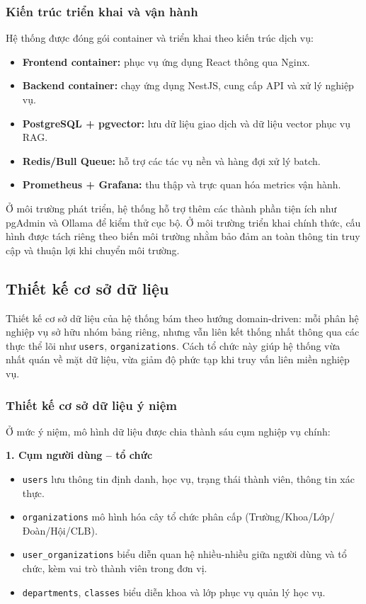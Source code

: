 \subsubsection{Kiến trúc triển khai và vận hành}
Hệ thống được đóng gói container và triển khai theo kiến trúc dịch vụ:
\begin{itemize}
	\item \textbf{Frontend container:} phục vụ ứng dụng React thông qua Nginx.
	\item \textbf{Backend container:} chạy ứng dụng NestJS, cung cấp API và xử lý nghiệp vụ.
	\item \textbf{PostgreSQL + pgvector:} lưu dữ liệu giao dịch và dữ liệu vector phục vụ RAG.
	\item \textbf{Redis/Bull Queue:} hỗ trợ các tác vụ nền và hàng đợi xử lý batch.
	\item \textbf{Prometheus + Grafana:} thu thập và trực quan hóa metrics vận hành.
\end{itemize}

Ở môi trường phát triển, hệ thống hỗ trợ thêm các thành phần tiện ích như pgAdmin và Ollama để kiểm thử cục bộ. Ở môi trường triển khai chính thức, cấu hình được tách riêng theo biến môi trường nhằm bảo đảm an toàn thông tin truy cập và thuận lợi khi chuyển môi trường.

\subsection{Thiết kế cơ sở dữ liệu}
Thiết kế cơ sở dữ liệu của hệ thống bám theo hướng domain-driven: mỗi phân hệ nghiệp vụ sở hữu nhóm bảng riêng, nhưng vẫn liên kết thống nhất thông qua các thực thể lõi như \texttt{users}, \texttt{organizations}. Cách tổ chức này giúp hệ thống vừa nhất quán về mặt dữ liệu, vừa giảm độ phức tạp khi truy vấn liên miền nghiệp vụ.

\subsubsection{Thiết kế cơ sở dữ liệu ý niệm}
Ở mức ý niệm, mô hình dữ liệu được chia thành sáu cụm nghiệp vụ chính:

\textbf{1. Cụm người dùng -- tổ chức}
\begin{itemize}
	\item \texttt{users} lưu thông tin định danh, học vụ, trạng thái thành viên, thông tin xác thực.
	\item \texttt{organizations} mô hình hóa cây tổ chức phân cấp (Trường/Khoa/Lớp/Đoàn/Hội/CLB).
	\item \texttt{user\_organizations} biểu diễn quan hệ nhiều-nhiều giữa người dùng và tổ chức, kèm vai trò thành viên trong đơn vị.
	\item \texttt{departments}, \texttt{classes} biểu diễn khoa và lớp phục vụ quản lý học vụ.
\end{itemize}

